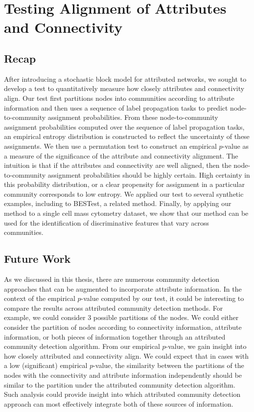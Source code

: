 \section{Testing Alignment of Attributes and Connectivity}

\subsection{Recap}
After introducing a stochastic block model for attributed networks, we sought to develop a test to quantitatively measure how closely attributes and connectivity align. Our test first partitions nodes into communities according to attribute information and then uses a sequence of label propagation tasks to predict node-to-community assignment probabilities. From these node-to-community assignment probabilities computed over the sequence of label propagation tasks, an empirical entropy distribution is constructed to reflect the uncertainty of these assignments. We then use a permutation test to construct an empirical $p$-value as a measure of the significance of the attribute and connectivity alignment. The intuition is that if the attributes and connectivity are well aligned, then the node-to-community assignment probabilities should be highly certain. High certainty in this probability distribution, or a clear propensity for assignment in a particular community corresponds to low entropy. We applied our test to several synthetic examples, including to BESTest, a related method. Finally, by applying our method to a single cell mass cytometry dataset, we show that our method can be used for the identification of discriminative features that vary across communities.

\subsection{Future Work}
As we discussed in this thesis, there are numerous community detection approaches that can be augmented to incorporate attribute information. In the context of the empirical $p$-value computed by our test, it could be interesting to compare the results across attributed community detection methods. For example, we could consider 3 possible partitions of the nodes. We could either consider the partition of nodes according to connectivity information, attribute information, or both pieces of information together through an attributed community detection algorithm. From our empirical $p$-value, we gain insight into how closely attributed and connectivity align. We could expect that in cases with a low (significant) empirical $p$-value, the similarity between the partitions of the nodes with the connectivity and attribute information independently should be similar to the partition under the attributed community detection algorithm. Such analysis could provide insight into which attributed community detection approach can most effectively integrate both of these sources of information. 




